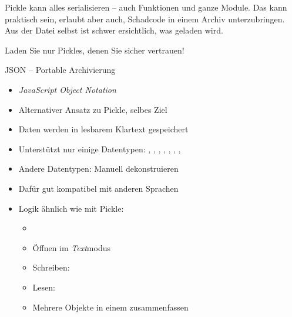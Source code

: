 \begin{frame}
%
\begin{warnbox}
Pickle kann alles serialisieren -- auch Funktionen und ganze Module. Das kann praktisch sein, erlaubt aber auch, Schadcode in einem Archiv unterzubringen. Aus der Datei selbst ist schwer ersichtlich, was geladen wird.

Laden Sie nur Pickles, denen Sie sicher vertrauen!
\end{warnbox}
%
\end{frame}


\begin{frame}[fragile]{JSON -- Portable Archivierung}
%
\begin{itemize}
\item \emph{JavaScript Object Notation}
\item Alternativer Ansatz zu Pickle, selbes Ziel
\item Daten werden in lesbarem Klartext gespeichert
\item Unterstützt nur einige Datentypen: , , , , , , , 
\item Andere Datentypen: Manuell dekonstruieren
\item Dafür gut kompatibel mit anderen Sprachen
\item Logik ähnlich wie mit Pickle:
	\begin{itemize}
	\item {}
	\item Öffnen im \emph{Text}modus
	\item Schreiben: 
	\item Lesen: 
	\item Mehrere Objekte in einem  zusammenfassen
	\end{itemize}
\end{itemize}
%
\end{frame}


